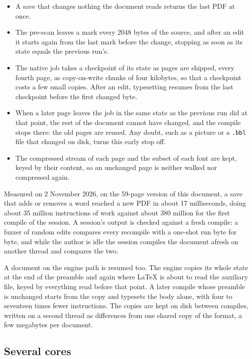 \documentclass{article}
\numberwithin{equation}{section}
\theoremstyle{definition}
\theoremstyle{remark}
\begin{document}
\begin{itemize}
  \item A save that changes nothing the document reads returns the last PDF at once.
  \item The pre-scan leaves a mark every 2048 bytes of the source, and after an edit it
        starts again from the last mark before the change, stopping as soon as its state
        equals the previous run's.
  \item The native job takes a checkpoint of its state as pages are shipped, every
        fourth page, as copy-on-write chunks of four kilobytes, so that a checkpoint
        costs a few small copies. After an edit, typesetting resumes from the last
        checkpoint before the first changed byte.
  \item When a later page leaves the job in the same state as the previous run did at
        that point, the rest of the document cannot have changed, and the compile stops
        there: the old pages are reused. Any doubt, such as a picture or a
        \texttt{.bbl} file that changed on disk, turns this early stop off.
  \item The compressed stream of each page and the subset of each font are kept, keyed
        by their content, so an unchanged page is neither walked nor compressed again.
\end{itemize}

Measured on 2 November 2026, on the 59-page version of this document, a save that adds or
removes a word reached a new PDF in about 17
milliseconds, doing about 35 million instructions of work against about 380 million for
the first compile of the session. A session's output is checked against a fresh compile: a fuzzer of random edits
compares every recompile with a one-shot run byte for byte, and while the author is idle
the session compiles the document afresh on another thread and compares the two.

A document on the engine path is resumed too. The engine copies its whole state at the
end of the preamble and again where \LaTeX{} is about to read the auxiliary file, keyed
by everything read before that point. A later compile whose preamble is unchanged starts
from the copy and typesets the body alone, with four to seventeen times fewer
instructions. The copies are kept on disk between compiles, written on a second thread
as differences from one shared copy of the format, a few megabytes per document.

\subsection{Several cores}
\end{document}
